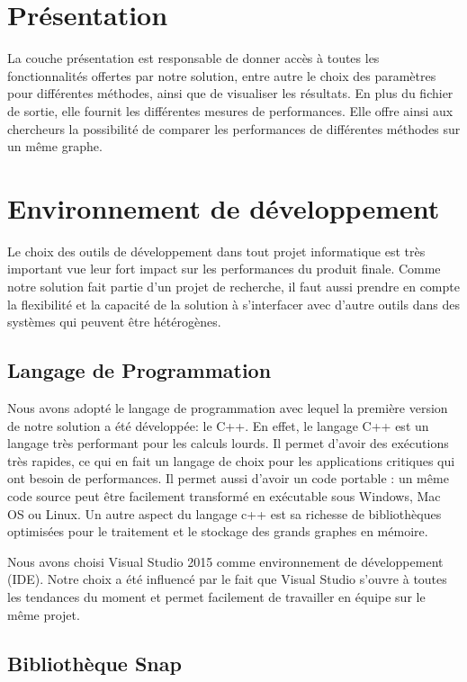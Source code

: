 	
	\section{Présentation}
	
	La couche présentation est responsable de donner accès à toutes les fonctionnalités offertes par notre solution, entre autre le choix des paramètres pour différentes méthodes, ainsi que de visualiser les résultats. En plus du fichier de sortie, elle fournit les différentes mesures de performances. Elle offre ainsi aux chercheurs la possibilité de comparer les performances de différentes méthodes sur un même graphe. 
	
	\section{Environnement de développement}
		
		Le choix des outils de développement dans tout projet informatique est très important vue leur fort impact sur les performances du produit finale. Comme notre solution fait partie d'un projet de recherche, il faut aussi prendre en compte la flexibilité et la capacité de la solution à s'interfacer avec d'autre outils dans des systèmes qui peuvent être hétérogènes. 
		
		\subsection{Langage de Programmation}
		Nous avons adopté le langage de programmation avec lequel la    première version de notre solution a été développée: le C++. En effet, le langage C++ est un langage très performant pour les calculs lourds. Il permet d'avoir des exécutions très rapides, ce qui en fait un langage de choix pour les applications critiques qui ont besoin de performances. Il permet aussi d'avoir un code portable : un même code source peut être facilement transformé en exécutable sous Windows, Mac OS ou Linux. Un autre aspect du langage c++ est sa richesse de bibliothèques optimisées pour le traitement et le stockage des grands graphes en mémoire. 
		
		Nous avons choisi Visual Studio 2015 comme environnement de développement (IDE). Notre choix a été influencé par le fait que Visual Studio s'ouvre à toutes les tendances du moment et permet facilement de travailler en équipe sur le même projet.
		
		\subsection{Bibliothèque Snap}
		\label{snaplib}
			
